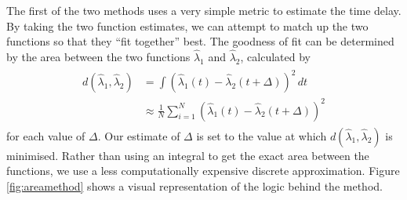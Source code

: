\documentclass[a4paper,11pt]{article}
\begin{document}
   The first of the two methods uses a very simple metric to estimate the time
   delay. By taking the two function estimates, we can attempt to match up the
   two functions so that they ``fit together'' best. The goodness of fit can be
   determined by the area between the two functions $\hat{\lambda}_1$ and
   $\hat{\lambda}_2$, calculated by
   \begin{align}
   \begin{split}
   d(\hat{\lambda}_1,\hat{\lambda}_2)&=\int(\hat{\lambda}_1(t)-\hat{\lambda}_2(t+\Delta))^2\,dt\\
   &\approx\frac{1}{N}\sum_{i=1}^N(\hat{\lambda}_1(t)-\hat{\lambda}_2(t+\Delta))^2
   \end{split}
   \end{align}
   for each value of $\Delta$. Our estimate of $\Delta$ is set to the value at
   which $d(\hat{\lambda}_1,\hat{\lambda}_2)$ is minimised. Rather than using an
   integral to get the exact area between the functions, we use a less
   computationally expensive discrete approximation. Figure \ref{fig:areamethod}
   shows a visual representation of the logic behind the method.
\end{document}
